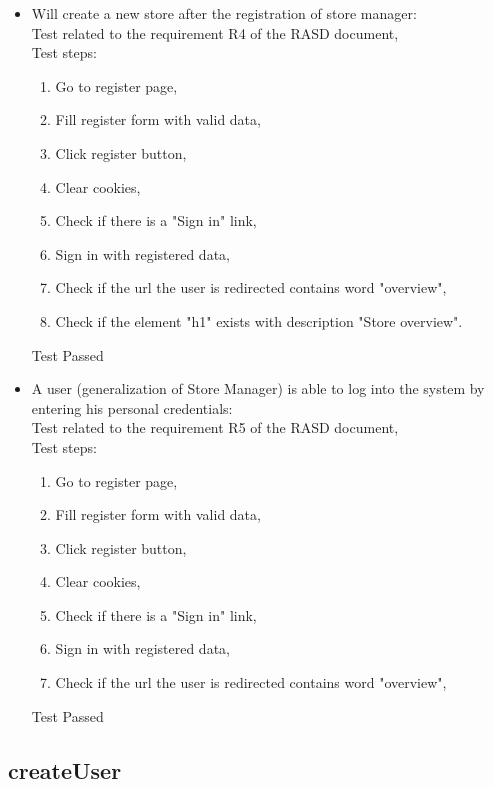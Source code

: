 \begin{itemize}
    \item Will create a new store after the registration of store manager: \\
    Test related to the requirement R4 of the RASD document, \\
    Test steps:
    \begin{enumerate}
        \item Go to register page,
        \item Fill register form with valid data,
        \item Click register button,
        \item Clear cookies,
        \item Check if there is a "Sign in" link,
        \item Sign in with registered data,
        \item Check if the url the user is redirected contains word "overview",
        \item Check if the element "h1" exists with description "Store overview".
    \end{enumerate}
    Test Passed \\

    \item A user (generalization of Store Manager) is able to log into the system by entering his personal credentials: \\
    Test related to the requirement R5 of the RASD document, \\
    Test steps:
    \begin{enumerate}
        \item Go to register page,
        \item Fill register form with valid data,
        \item Click register button,
        \item Clear cookies,
        \item Check if there is a "Sign in" link,
        \item Sign in with registered data,
        \item Check if the url the user is redirected contains word "overview",
    \end{enumerate}
    Test Passed \\

\end{itemize}
\subsection{createUser}

